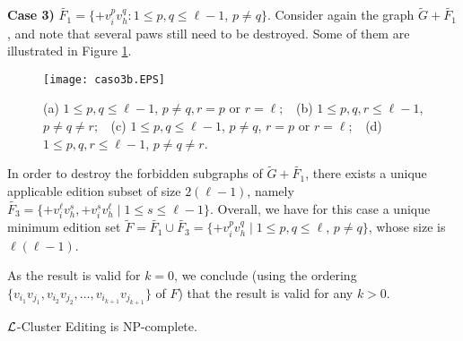 \documentclass[12pt]{article}
\def\qed{ \fbox \par \medskip }
\def\qed2{ \hfill \framebox[.09in] \par \bigskip }
\def\L{{\cal L}}
\begin{document}
\noindent
\textbf{Case 3)} $\widetilde{F_1}= \{+v_i^p v_h^q: 1 \leq p,q \leq \ell-1$, $p\not=q\}$. Consider again the graph $\widetilde{G} + \widetilde{F_1}$, and note that several paws still need to be destroyed. Some of them are illustrated in Figure \ref{caso3}.

\begin{figure}[htb]
\centering
\texttt{[image: caso3b.EPS]}
\caption{\label{caso3}(a) $1 \leq p,q \leq \ell-1$, $p\not=q, r=p$ or $r=\ell;\;\;$
(b) $1 \leq p,q,r \leq \ell-1$, $p\not=q\not=r; \;\;$
(c) $1 \leq p,q \leq \ell-1$, $p\not=q$, $r=p$ or $r=\ell;\;\;$
(d) $1 \leq p,q,r \leq \ell-1$, $p\not=q\not=r$.}
\end{figure}

In order to destroy the forbidden subgraphs of $\widetilde{G} + \widetilde{F_1}$, there exists a unique applicable edition subset of size $2(\ell -1)$, namely
$\widetilde{F_3} = \{+v_i^\ell v_h^s, +v_i^s v_h^{\ell} \mid 1 \leq s \leq \ell-1\}$. Overall, we have for this case a unique minimum edition set
$\widetilde{F} = \widetilde{F_1} \cup \widetilde{F_3} = \{+v_i^p v_h^q \mid 1 \leq p,q \leq \ell$, $p\not=q\}$, whose size is $\ell(\ell-1)$.

As the result is valid for $k=0$, we conclude (using the ordering $\{v_{i_1}v_{j_1}, v_{i_2}v_{j_2}, \ldots, v_{i_{k+1}}v_{j_{k+1}}\}$ of $F$) that the result is valid for any $k>0$. \qed2

\begin{teo}
$\L${\sc -Cluster Editing} is NP-complete.
\end{teo}
\end{document}

